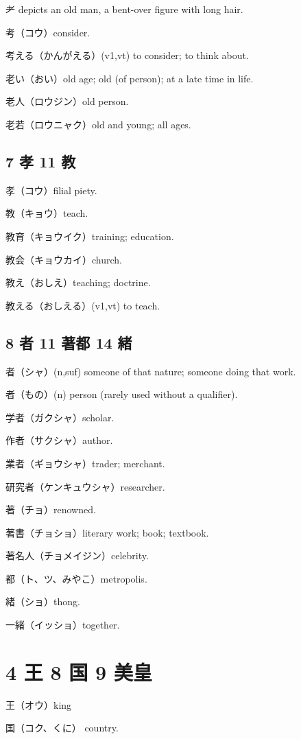 耂 depicts an old man, a bent-over figure with long hair.

考（コウ）consider.

考える（かんがえる）(v1,vt) to consider; to think about.

老い（おい）old age; old (of person); at a late time in life.

老人（ロウジン）old person.

老若（ロウニャク）old and young; all ages.

\subsection{7 孝 11 教}

孝（コウ）filial piety.

教（キョウ）teach.

教育（キョウイク）training; education.

教会（キョウカイ）church.

教え（おしえ）teaching; doctrine.

教える（おしえる）(v1,vt) to teach.

\subsection{8 者 11 著都 14 緒}

者（シャ）(n,suf) someone of that nature; someone doing that work.

者（もの）(n) person (rarely used without a qualifier).

学者（ガクシャ）scholar.

作者（サクシャ）author.

業者（ギョウシャ）trader; merchant.

研究者（ケンキュウシャ）researcher.

著（チョ）renowned.

著書（チョショ）literary work; book; textbook.

著名人（チョメイジン）celebrity.

都（ト、ツ、みやこ）metropolis.

緒（ショ）thong.

一緒（イッショ）together.

\section{4 王 8 国 9 美皇}

王（オウ）king

国（コク、くに） country.

